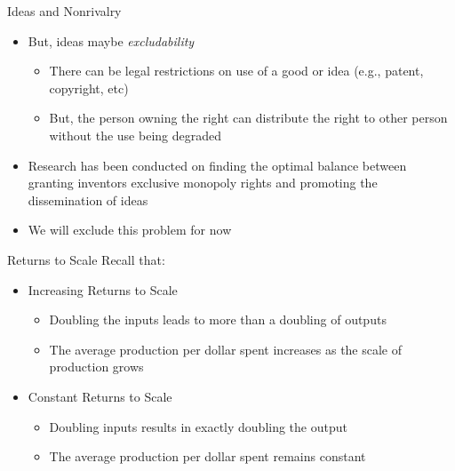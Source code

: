 \documentclass[aspectratio=1610]{beamer}
\begin{document}
\begin{frame}[wide]{Ideas and Nonrivalry}
	\begin{itemize}
		\item But, ideas maybe \textit{excludability}
		\begin{itemize}
			\item There can be legal restrictions on use of a good or idea (e.g., patent, copyright, etc)
			\item But, the person owning the right can distribute the right to other person without the use being degraded
		\end{itemize}
		\item Research has been conducted on finding the optimal balance between granting inventors exclusive monopoly rights and promoting the dissemination of ideas
		\item We will exclude this problem for now
	\end{itemize}
\end{frame}

\begin{frame}[wide]{Returns to Scale}
	Recall that:
	\begin{itemize}
		\item Increasing Returns to Scale
		\vspace{2mm}
		\begin{itemize}
			\item Doubling the inputs leads to more than a doubling of outputs
			\item The average production per dollar spent increases as the scale of production grows
		\end{itemize}
		\item Constant Returns to Scale
		\vspace{2mm}
		\begin{itemize}
			\item Doubling inputs results in exactly doubling the output
			\item The average production per dollar spent remains constant
		\end{itemize}
	\end{itemize}
\end{frame}
\end{document}
